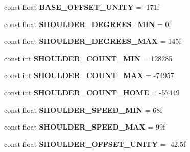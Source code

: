 \begin{DoxyCompactItemize}
\item 
\mbox{\label{class_scorbot_e_r_i_x_a48963e027682674379d3b19be69e7ca2}} 
const float {\bfseries B\+A\+S\+E\+\_\+\+O\+F\+F\+S\+E\+T\+\_\+\+U\+N\+I\+TY} = -\/171f
\item 
\mbox{\label{class_scorbot_e_r_i_x_abf5def60bf51e7f5dafb62c7ee4be5b0}} 
const float {\bfseries S\+H\+O\+U\+L\+D\+E\+R\+\_\+\+D\+E\+G\+R\+E\+E\+S\+\_\+\+M\+IN} = 0f
\item 
\mbox{\label{class_scorbot_e_r_i_x_ae2ec88d4bbc6e616043a829d44af60fc}} 
const float {\bfseries S\+H\+O\+U\+L\+D\+E\+R\+\_\+\+D\+E\+G\+R\+E\+E\+S\+\_\+\+M\+AX} = 145f
\item 
\mbox{\label{class_scorbot_e_r_i_x_afb9e614c6e3c1ad3e4a837431da57baa}} 
const int {\bfseries S\+H\+O\+U\+L\+D\+E\+R\+\_\+\+C\+O\+U\+N\+T\+\_\+\+M\+IN} = 128285
\item 
\mbox{\label{class_scorbot_e_r_i_x_a5aea6e74f6106645659af6277b7985d9}} 
const int {\bfseries S\+H\+O\+U\+L\+D\+E\+R\+\_\+\+C\+O\+U\+N\+T\+\_\+\+M\+AX} = -\/74957
\item 
\mbox{\label{class_scorbot_e_r_i_x_a37670e096b48f9a8e208f62e8251a63a}} 
const int {\bfseries S\+H\+O\+U\+L\+D\+E\+R\+\_\+\+C\+O\+U\+N\+T\+\_\+\+H\+O\+ME} = -\/57449
\item 
\mbox{\label{class_scorbot_e_r_i_x_a93c70776a83323ff29435e128a4dc9e1}} 
const float {\bfseries S\+H\+O\+U\+L\+D\+E\+R\+\_\+\+S\+P\+E\+E\+D\+\_\+\+M\+IN} = 68f
\item 
\mbox{\label{class_scorbot_e_r_i_x_ac954f63aedcf1340b4d1ecd95d8f5a0c}} 
const float {\bfseries S\+H\+O\+U\+L\+D\+E\+R\+\_\+\+S\+P\+E\+E\+D\+\_\+\+M\+AX} = 99f
\item 
\mbox{\label{class_scorbot_e_r_i_x_a66aa4b2a89db3da86451ca65d03cc85e}} 
const float {\bfseries S\+H\+O\+U\+L\+D\+E\+R\+\_\+\+O\+F\+F\+S\+E\+T\+\_\+\+U\+N\+I\+TY} = -\/42.\+5f
\item 
\mbox{\label{class_scorbot_e_r_i_x_a7e345c8cb678ece3c4b4976d2b7a4c97}} 

\end{DoxyCompactItemize}
